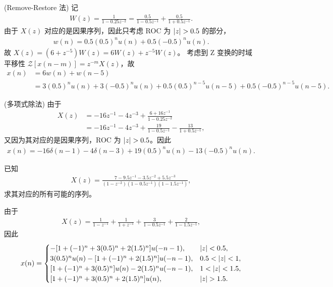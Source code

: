 \begin{solution}
    (Remove-Restore 法)
    记
    \begin{align*}
        W(z) = \frac{1}{1 - 0.25z^{-2}} = \frac{0.5}{1 - 0.5z^{-1}} + \frac{0.5}{1 + 0.5z^{-1}}.
    \end{align*}
    由于 $X(z)$ 对应的是因果序列，因此只考虑 ROC 为 $\left|z\right| > 0.5$ 的部分，
    \begin{align*}
        w(n) = 0.5(0.5)^n u(n) + 0.5(-0.5)^n u(n).
    \end{align*}
    故 $X(z) = (6 + z^{-5})W(z) = 6W(z) + z^{-5}W(z)$。
    考虑到 Z 变换的时域平移性 $\mathcal{Z}[x(n-m)] = z^{-m}X(z)$，故
    \begin{align*}
        x(n) & = 6w(n) + w(n - 5) \\
        & = 3(0.5)^nu(n) + 3(-0.5)^nu(n) + 0.5(0.5)^{n-5}u(n-5) + 0.5(-0.5)^{n-5}u(n-5).
    \end{align*}
\end{solution}

\begin{solution}
    (多项式除法)
    由于
    \begin{align*}
        X(z) & = -16z^{-1} - 4z^{-3} + \frac{6 + 16z^{-1}}{1 - 0.25z^{-2}} \\
        & = -16z^{-1} - 4z^{-3} + \frac{19}{1 - 0.5z^{-1}} - \frac{13}{1 + 0.5z^{-1}},
    \end{align*}
    又因为其对应的是因果序列，ROC 为 $\left|z\right| > 0.5$。因此
    \begin{align*}
        x(n) = -16\delta(n - 1) - 4\delta(n - 3) + 19(0.5)^n u(n) - 13(-0.5)^n u(n).
    \end{align*}
\end{solution}

\begin{example}
    已知
    \begin{align*}
        X(z) = \frac{7 - 9.5z^{-1} - 3.5z^{-2} + 5.5z^{-3}}{(1 - z^{-2})(1 - 0.5z^{-1})(1 - 1.5z^{-1})},
    \end{align*}
    求其对应的所有可能的序列。
\end{example}

\begin{solution}
    由于
    \begin{align*}
        X(z) = \frac{1}{1 - z^{-1}} + \frac{1}{1 + z^{-1}} + \frac{3}{1 - 0.5z^{-1}} + \frac{2}{1 - 1.5z^{-1}},
    \end{align*}
    因此
    \begin{align*}
        x(n) = \begin{cases}
            -[1 + (-1)^n + 3(0.5)^n + 2(1.5)^n] u(-n-1), & \left|z\right| < 0.5, \\
            3(0.5)^n u(n) - [1 + (-1)^n + 2(1.5)^n] u(-n-1), & 0.5 < \left|z\right| < 1, \\
            [1 + (-1)^n + 3(0.5)^n] u(n) - 2(1.5)^n u(-n-1), & 1 < \left|z\right| < 1.5, \\
            [1 + (-1)^n + 3(0.5)^n + 2(1.5)^n] u(n), & \left|z\right| > 1.5.
        \end{cases}
    \end{align*}
\end{solution}

